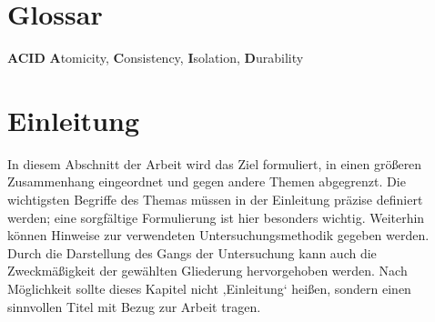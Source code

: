 \documentclass[11pt]{scrartcl}
\begin{document}
\section*{Glossar}
% 
\textbf{ACID} \textbf{A}tomicity, \textbf{C}onsistency, \textbf{I}solation, \textbf{D}urability \\
\clearpage

% 
% 

\listoffigures
{}
\newpage

\listoftables
{}
\newpage

\onehalfspacing

\pagestyle{scrheadings}
\clearpairofpagestyles
\lohead{\rightmark}
\rohead{\pagemark}{\pagemark}

\setcounter{page}{1}


%
% 
% 

\section{Einleitung}
In diesem Abschnitt der Arbeit wird das Ziel formuliert, in einen größeren Zusammenhang eingeordnet und gegen andere Themen abgegrenzt. Die wichtigsten Begriffe des Themas müssen in der Einleitung präzise definiert werden; eine sorgfältige Formulierung ist hier besonders wichtig. Weiterhin können Hinweise zur verwendeten Untersuchungsmethodik gegeben werden. Durch die Darstellung des Gangs der Untersuchung kann auch die Zweckmäßigkeit der gewählten Gliederung hervorgehoben werden.  Nach Möglichkeit sollte dieses Kapitel nicht ‚Einleitung‘ heißen, sondern einen sinnvollen Titel mit Bezug zur Arbeit tragen.
\end{document}
